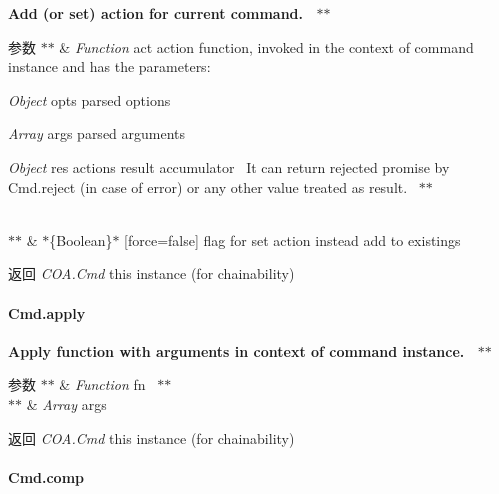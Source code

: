 {\bfseries {\bfseries {\bfseries  Add (or set) action for current command.~\newline
 $\ast$$\ast$
\begin{DoxyParams}{参数}
{\em $\ast$$\ast$} & {\itshape Function} {\ttfamily act} action function, invoked in the context of command instance and has the parameters\+:~\newline

\begin{DoxyItemize}
\item {\itshape Object} {\ttfamily opts} parsed options~\newline

\item {\itshape Array} {\ttfamily args} parsed arguments~\newline

\item {\itshape Object} {\ttfamily res} actions result accumulator~\newline
 It can return rejected promise by Cmd.\+reject (in case of error) or any other value treated as result.~\newline
 $\ast$$\ast$
\end{DoxyItemize}\\
\hline
{\em $\ast$$\ast$} & $\ast$\{Boolean\}$\ast$ \mbox{[}force=false\mbox{]} flag for set action instead add to existings~\newline
 {\bfseries }\\
\hline
\end{DoxyParams}
\begin{DoxyReturn}{返回}
{\bfseries } {\itshape C\+O\+A.\+Cmd} {\ttfamily this} instance (for chainability)
\end{DoxyReturn}
\paragraph*{Cmd.\+apply}}}}

{\bfseries {\bfseries {\bfseries  Apply function with arguments in context of command instance.~\newline
 $\ast$$\ast$
\begin{DoxyParams}{参数}
{\em $\ast$$\ast$} & {\itshape Function} {\ttfamily fn}~\newline
 $\ast$$\ast$\\
\hline
{\em $\ast$$\ast$} & {\itshape Array} {\ttfamily args}~\newline
 {\bfseries }\\
\hline
\end{DoxyParams}
\begin{DoxyReturn}{返回}
{\bfseries } {\itshape C\+O\+A.\+Cmd} {\ttfamily this} instance (for chainability)
\end{DoxyReturn}
\paragraph*{Cmd.\+comp}}}}

